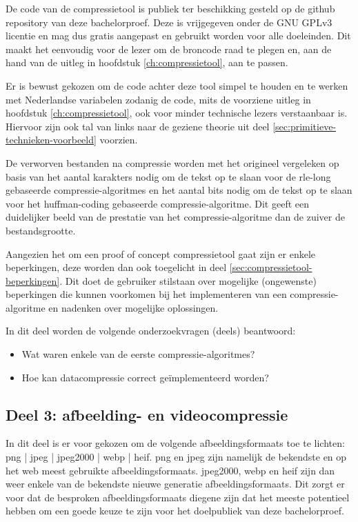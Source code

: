 De code van de \gls{compressietool} is publiek ter beschikking gesteld op de \gls{github} repository van deze bachelorproef. Deze is vrijgegeven onder de GNU GPLv3 licentie en mag dus gratis aangepast en gebruikt worden voor alle doeleinden. Dit maakt het eenvoudig voor de lezer om de broncode raad te plegen en, aan de hand van de uitleg in hoofdstuk \ref{ch:compressietool}, aan te passen.

Er is bewust gekozen om de code achter deze tool simpel te houden en te werken met Nederlandse variabelen zodanig de code, mits de voorziene uitleg in hoofdstuk \ref{ch:compressietool}, ook voor minder technische lezers verstaanbaar is. Hiervoor zijn ook tal van links naar de geziene theorie uit deel \ref{sec:primitieve-technieken-voorbeeld} voorzien.

De verworven bestanden na compressie worden met het origineel vergeleken op basis van het aantal karakters nodig om de tekst op te slaan voor de \gls{rle-long} gebaseerde \glspl{compressie-algoritme} en het aantal bits nodig om de tekst op te slaan voor het \gls{huffman-coding} gebaseerde \gls{compressie-algoritme}. Dit geeft een duidelijker beeld van de prestatie van het \gls{compressie-algoritme} dan de zuiver de bestandsgrootte.

Aangezien het om een proof of concept \gls{compressietool} gaat zijn er enkele beperkingen, deze worden dan ook toegelicht in deel \ref{sec:compressietool-beperkingen}. Dit doet de gebruiker stilstaan over mogelijke (ongewenste) beperkingen die kunnen voorkomen bij het implementeren van een \gls{compressie-algoritme} en nadenken over mogelijke oplossingen.

In dit deel worden de volgende onderzoekvragen (deels) beantwoord: 
\begin{itemize}
	\item Wat waren enkele van de eerste \glspl{compressie-algoritme}?
	\item Hoe kan \gls{datacompressie} correct geïmplementeerd worden?
\end{itemize}

\subsection{Deel 3: afbeelding- en videocompressie}
\label{sec:aanpak-bachelorproef-deel-3}

In dit deel is er voor gekozen om de volgende \glspl{afbeeldingsformaat} toe te lichten: \gls{png} | \gls{jpeg} | \gls{jpeg2000} | \gls{webp} | \gls{heif}. \Gls{png} en \gls{jpeg} zijn namelijk de bekendste en op het web meest gebruikte \glspl{afbeeldingsformaat}. \Gls{jpeg2000}, \gls{webp} en \gls{heif} zijn dan weer enkele van de bekendste nieuwe generatie \glspl{afbeeldingsformaat}. Dit zorgt er voor dat de besproken \glspl{afbeeldingsformaat} diegene zijn dat het meeste potentieel hebben om een goede keuze te zijn voor het doelpubliek van deze bachelorproef.

